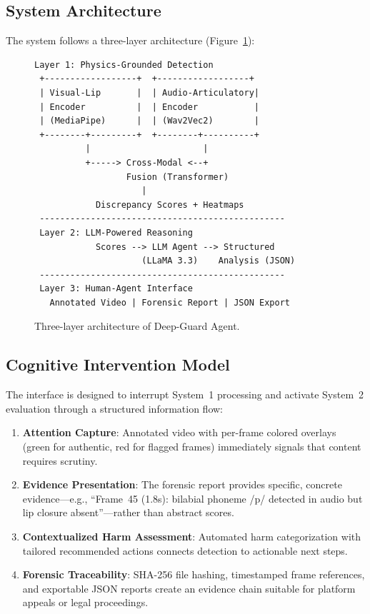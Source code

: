\documentclass[11pt,a4paper]{article}
\begin{document}
\subsection{System Architecture}

The system follows a three-layer architecture (Figure~\ref{fig:arch}):

\begin{figure}[H]
\centering
\small
\begin{lstlisting}[frame=none,backgroundcolor=\color{white}]
 Layer 1: Physics-Grounded Detection
 +------------------+  +------------------+
 | Visual-Lip       |  | Audio-Articulatory|
 | Encoder          |  | Encoder           |
 | (MediaPipe)      |  | (Wav2Vec2)        |
 +--------+---------+  +--------+----------+
          |                      |
          +-----> Cross-Modal <--+
                  Fusion (Transformer)
                     |
            Discrepancy Scores + Heatmaps
 ------------------------------------------------
 Layer 2: LLM-Powered Reasoning
            Scores --> LLM Agent --> Structured
                     (LLaMA 3.3)    Analysis (JSON)
 ------------------------------------------------
 Layer 3: Human-Agent Interface
   Annotated Video | Forensic Report | JSON Export
\end{lstlisting}
\caption{Three-layer architecture of Deep-Guard Agent.}
\label{fig:arch}
\end{figure}

\subsection{Cognitive Intervention Model}

The interface is designed to interrupt System~1 processing and activate System~2 evaluation through a structured information flow:

\begin{enumerate}[leftmargin=2em]
    \item \textbf{Attention Capture}: Annotated video with per-frame colored overlays (green for authentic, red for flagged frames) immediately signals that content requires scrutiny.
    \item \textbf{Evidence Presentation}: The forensic report provides specific, concrete evidence---e.g., ``Frame~45 (1.8s): bilabial phoneme /p/ detected in audio but lip closure absent''---rather than abstract scores.
    \item \textbf{Contextualized Harm Assessment}: Automated harm categorization with tailored recommended actions connects detection to actionable next steps.
    \item \textbf{Forensic Traceability}: SHA-256 file hashing, timestamped frame references, and exportable JSON reports create an evidence chain suitable for platform appeals or legal proceedings.
\end{enumerate}
\end{document}
